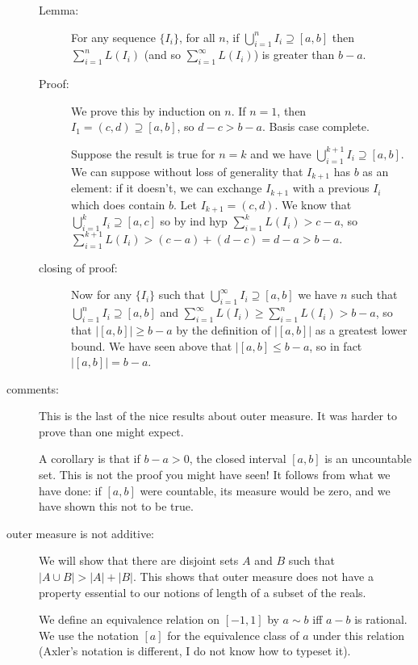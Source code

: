 \documentclass[12pt]{article}
\begin{document}
\begin{description}
\begin{description}
\item[Lemma:]  For any sequence $\{I_i\}$, for all $n$, if $\bigcup_{i=1}^n I_i \supseteq [a,b]$ then $\sum_{i=1}^n L(I_i)$ (and so $\sum_{i=1}^\infty L(I_i)$) is greater than $b-a$.

\item[Proof:]  We prove this by induction on $n$.  If $n=1$, then $I_1 = (c,d) \supseteq [a,b]$, so $d-c >b-a$.  Basis case complete.

Suppose the result is true for $n=k$ and we have $\bigcup_{i=1}^{k+1} I_i \supseteq [a,b]$.  We can suppose without loss of generality that $I_{k+1}$ has $b$
as an element:  if it doesn't, we can exchange $I_{k+1}$ with a previous $I_i$ which does contain $b$.  Let $I_{k+1} = (c,d)$.  We know that $\bigcup_{i=1}^{k} I_i \supseteq [a,c]$
so by ind hyp $\sum_{i=1}^k L(I_i) >c-a$, so  $\sum_{i=1}^{k+1 }L(I_i) >(c-a)+(d-c)=d-a>b-a$.

\item[closing of proof:]  Now for any $\{I_i\}$ such that $\bigcup _{i=1}^\infty I_i \supseteq [a,b]$ we have $n$ such that $\bigcup _{i=1}^n I_i \supseteq [a,b]$
and $\sum_{i=1}^\infty L(I_i) \geq \sum_{i=1}^n L(I_i)>b-a$, so that $|[a,b]| \geq b-a$ by the definition of $|[a,b]|$ as a greatest lower bound.  We have seen above that
$|[a,b] \leq b-a$, so in fact $|[a,b]|=b-a$.


\end{description}

\item[comments:]  This is the last of the nice results about outer measure.  It was harder to prove than one might expect.

A corollary is that if $b-a>0$, the closed interval $[a,b]$ is an uncountable set.  This is not the proof you might have seen!  It follows from what we have done:
if $[a,b]$ were countable, its measure would be zero, and we have shown this not to be true.

\item[outer measure is not additive:]  We will show that there are disjoint sets $A$ and $B$ such that $|A \cup B| > |A|+|B|$.  This shows that outer measure does not have a property essential to our notions of length of a subset of the reals.

We define an equivalence relation on $[-1,1]$ by $a \sim b$ iff $a-b$ is rational.  We use the notation $[a]$ for the equivalence class of $a$ under this relation (Axler's notation is different, I do not know how to typeset it).  


\end{description}
\end{document}
